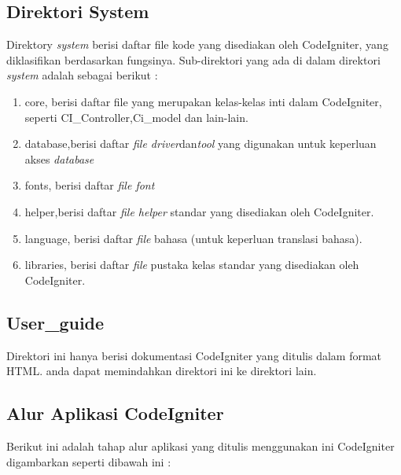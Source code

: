 \subsection{Direktori System}
Direktory \textit{system} berisi daftar file kode yang disediakan oleh CodeIgniter, yang diklasifikan berdasarkan fungsinya. Sub-direktori yang ada di dalam direktori \textit {system} adalah sebagai berikut :
\begin{enumerate}
\item core, berisi daftar file yang merupakan kelas-kelas inti dalam CodeIgniter, seperti CI\_Controller,Ci\_model dan lain-lain.
\item database,berisi daftar \textit{file driver}dan\textit{tool} yang digunakan untuk keperluan akses \textit{database}
\item fonts, berisi daftar \textit{file font}
\item helper,berisi daftar \textit{file helper} standar yang disediakan oleh CodeIgniter.
\item language, berisi daftar \textit{file} bahasa (untuk keperluan translasi bahasa).
\item libraries, berisi daftar \textit{file} pustaka kelas standar yang disediakan oleh CodeIgniter.
\end{enumerate}

\subsection{User\_guide}
Direktori ini hanya berisi dokumentasi CodeIgniter yang ditulis dalam format HTML. anda dapat memindahkan direktori ini ke direktori lain.
\subsection{Alur Aplikasi CodeIgniter}
Berikut ini adalah tahap alur aplikasi yang ditulis menggunakan ini CodeIgniter digambarkan seperti dibawah ini :

